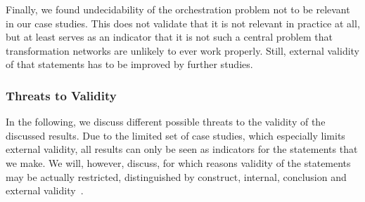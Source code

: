 Finally, we found undecidability of the orchestration problem not to be relevant in our case studies.
This does not validate that it is not relevant in practice at all, but at least serves as an indicator that it is not such a central problem that transformation networks are unlikely to ever work properly.
Still, external validity of that statements has to be improved by further studies.






\subsubsection{Threats to Validity}

In the following, we discuss different possible threats to the validity of the discussed results.
Due to the limited set of case studies, which especially limits external validity, all results can only be seen as indicators for the statements that we make.
We will, however, discuss, for which reasons validity of the statements may be actually restricted, distinguished by construct, internal, conclusion and external validity~\cite{wohlin2012validity-Book}. %

